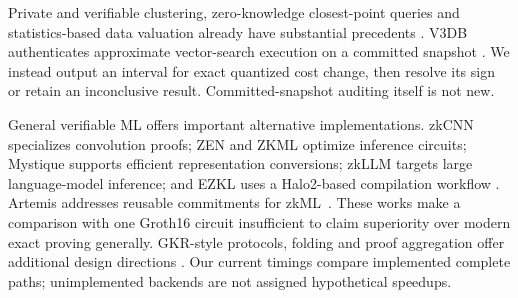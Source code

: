Private and verifiable clustering, zero-knowledge closest-point queries and
statistics-based data valuation already have substantial precedents
\cite{duan2008private,patel2013clustering,zhang2021verifiable,ghosh2016queries,wang2026zkvalue}.
V3DB authenticates approximate vector-search execution on a committed snapshot
\cite{v3db2026}. We instead output an interval for exact quantized cost change,
then resolve its sign or retain an inconclusive result. Committed-snapshot
auditing itself is not new.

General verifiable ML offers important alternative implementations. zkCNN
specializes convolution proofs; ZEN and ZKML optimize inference circuits;
Mystique supports efficient representation conversions; zkLLM targets large
language-model inference; and EZKL uses a Halo2-based compilation workflow
\cite{zkcnn2021,feng2021zen,chen2024zkml,weng2021mystique,sun2024zkllm,ezklsoftware}.
Artemis addresses reusable commitments for zkML~\cite{artemis2024}.
These works make a comparison with one Groth16 circuit insufficient to claim
superiority over modern exact proving generally. GKR-style protocols, folding
and proof aggregation offer additional design directions
\cite{thaler2013time,xie2019libra,kothapalli2022nova,gailly2022snarkpack}.
Our current timings compare implemented complete paths; unimplemented
backends are not assigned hypothetical speedups.
